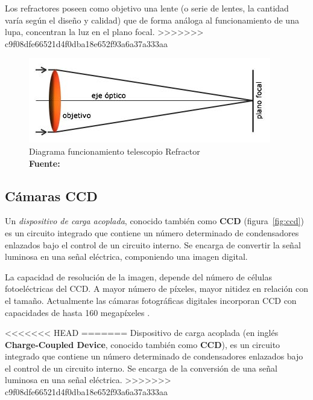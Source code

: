 \begin{itemize}
\begin{itemize}
\bigskip
Los refractores poseen como objetivo una lente (o serie de lentes, la cantidad varía según el diseño y calidad) que de forma análoga al funcionamiento de una lupa, concentran la luz en el plano focal. 
>>>>>>> c9f08dfe66521d4f0dba18e652f93a6a37a333aa


\begin{figure}[h]
	\centering
	\includegraphics[width=1\linewidth]{../images/refractor}
		\caption[Diagrama telescopio refractor]{Diagrama funcionamiento telescopio Refractor \\ \textbf{Fuente:}\cite{tipos_telescopios} }
	\label{fig:refractor}
\end{figure}



\subsection{Cámaras CCD} \label{ccd}

Un \textit{dispositivo de carga acoplada}, conocido también como \textbf{CCD} (figura~\ref{fig:ccd}) es un circuito integrado que contiene un número determinado de condensadores enlazados bajo el control de un circuito interno. Se encarga de convertir la señal luminosa en una señal eléctrica, componiendo una imagen digital. 


La capacidad de resolución de la imagen, depende del número de células fotoeléctricas del CCD. A mayor número de píxeles, mayor nitidez en relación con el tamaño. Actualmente las cámaras fotográficas digitales incorporan CCD con capacidades de hasta 160 megapíxeles \cite{ccd}.

<<<<<<< HEAD
=======
Dispositivo de carga acoplada (en inglés \textbf{Charge-Coupled Device}, conocido también como \textbf{CCD}), es un circuito integrado que contiene un número determinado de condensadores enlazados bajo el control de un circuito interno. Se encarga de la conversión de una señal luminosa en una señal eléctrica.
>>>>>>> c9f08dfe66521d4f0dba18e652f93a6a37a333aa


\end{itemize}
\end{itemize}
